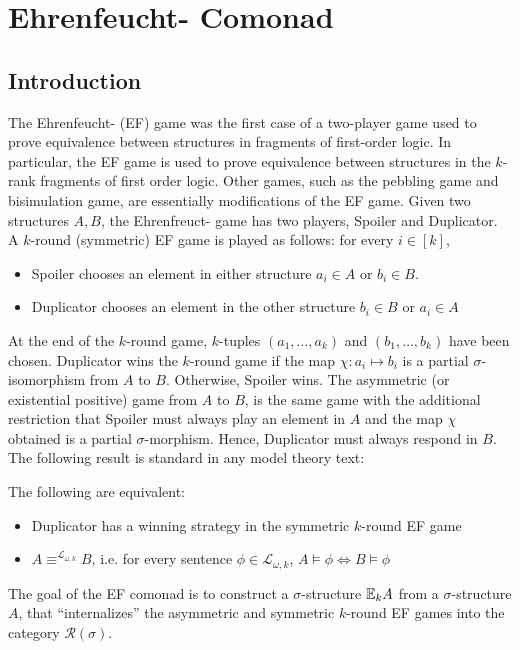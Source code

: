 \chapter{Ehrenfeucht-{\Fraisse} Comonad}
\section{Introduction}
The Ehrenfeucht-{\Fraisse} (EF) game was the first case of a two-player game used to prove equivalence between structures in fragments of first-order logic. In particular, the EF game is used to prove equivalence between structures in the $k$-rank fragments of first order logic. Other games, such as the pebbling game and bisimulation game, are essentially modifications of the EF game. Given two structures $A,B$, the Ehrenfreuct-{\Fraisse} game has two players, Spoiler and Duplicator. A $k$-round (symmetric) EF game is played as follows: for every $i \in [k]$, 
\begin{itemize}
\item Spoiler chooses an element in either structure $a_{i} \in A$ or $b_{i} \in B$. 
\item Duplicator chooses an element in the other structure $b_{i} \in B$ or $a_{i} \in A$  
\end{itemize}
At the end of the $k$-round game, $k$-tuples $(a_{1},\dots,a_{k})$ and $(b_{1},\dots,b_{k})$ have been chosen. Duplicator wins the $k$-round game if the map $\chi:a_{i} \longmapsto b_{i}$ is a partial $\sigma$-isomorphism from $A$ to $B$. Otherwise, Spoiler wins. The asymmetric (or existential positive) game from $A$ to $B$, is the same game with the additional restriction that Spoiler must always play an element in $A$ and the map $\chi$ obtained is a partial $\sigma$-morphism. Hence, Duplicator must always respond in $B$. The following result is standard in any model theory text:
\begin{prop}
The following are equivalent:
\begin{itemize}
\item Duplicator has a winning strategy in the symmetric $k$-round EF game 
\item $A \equiv^{\mathcal{L}_{\omega,k}} B$, i.e. for every sentence $\phi \in \mathcal{L}_{\omega,k}$, $A \vDash \phi \Leftrightarrow B \vDash \phi$
\end{itemize}
\end{prop}
The goal of the EF comonad is to construct a $\sigma$-structure ${\mathbb{E}_{k}A}$ from a $\sigma$-structure $A$, that ``internalizes'' the asymmetric and symmetric $k$-round EF games into the category $\mathcal{R}(\sigma)$.  

